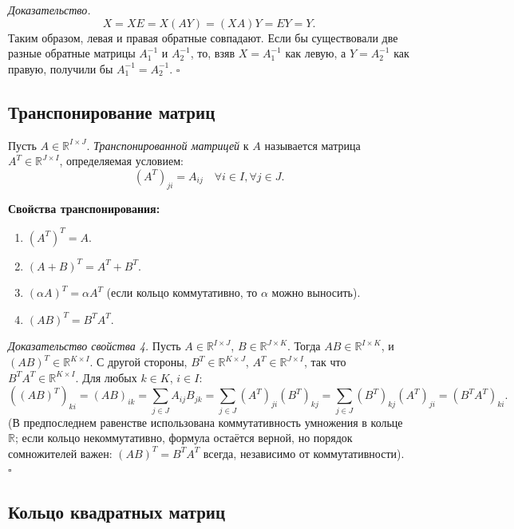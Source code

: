 \documentclass[a4paper,12pt]{article}
\theoremstyle{definition}
\theoremstyle{plain}
\theoremstyle{remark}
\begin{document}
	\medskip
	\textit{Доказательство.}
	\[
	X = X E = X (A Y) = (X A) Y = E Y = Y.
	\]
	Таким образом, левая и правая обратные совпадают. Если бы существовали две разные обратные матрицы \( A_1^{-1} \) и \( A_2^{-1} \), то, взяв \( X = A_1^{-1} \) как левую, а \( Y = A_2^{-1} \) как правую, получили бы \( A_1^{-1} = A_2^{-1} \). \hfill \(\square\)
	
	\subsection{Транспонирование матриц}
	
	\begin{tcolorbox}[colback=red!5, colframe=red!50!black, title=Определение]
		Пусть \( A \in \mathbb{R}^{I \times J} \). \textit{Транспонированной матрицей} к \( A \) называется матрица \( A^T \in \mathbb{R}^{J \times I} \), определяемая условием:
		\[
		(A^T)_{ji} = A_{ij} \quad \forall i \in I, \forall j \in J.
		\]
	\end{tcolorbox}
	
	\medskip
	\noindent \textbf{Свойства транспонирования:}
	\begin{enumerate}
		\item \((A^T)^T = A\).
		\item \((A + B)^T = A^T + B^T\).
		\item \((\alpha A)^T = \alpha A^T\) (если кольцо коммутативно, то \(\alpha\) можно выносить).
		\item \((AB)^T = B^T A^T\).
	\end{enumerate}
	
	\textit{Доказательство свойства 4.}
	Пусть \( A \in \mathbb{R}^{I \times J} \), \( B \in \mathbb{R}^{J \times K} \). Тогда \( AB \in \mathbb{R}^{I \times K} \), и \( (AB)^T \in \mathbb{R}^{K \times I} \). С другой стороны, \( B^T \in \mathbb{R}^{K \times J} \), \( A^T \in \mathbb{R}^{J \times I} \), так что \( B^T A^T \in \mathbb{R}^{K \times I} \). Для любых \( k \in K \), \( i \in I \):
	\[
	((AB)^T)_{ki} = (AB)_{ik} = \sum_{j \in J} A_{ij} B_{jk} = \sum_{j \in J} (A^T)_{ji} (B^T)_{kj} = \sum_{j \in J} (B^T)_{kj} (A^T)_{ji} = (B^T A^T)_{ki}.
	\]
	(В предпоследнем равенстве использована коммутативность умножения в кольце \( \mathbb{R} \); если кольцо некоммутативно, формула остаётся верной, но порядок сомножителей важен: \((AB)^T = B^T A^T\) всегда, независимо от коммутативности). \hfill \(\square\)
	
	\subsection{Кольцо квадратных матриц}
	
\end{document}
